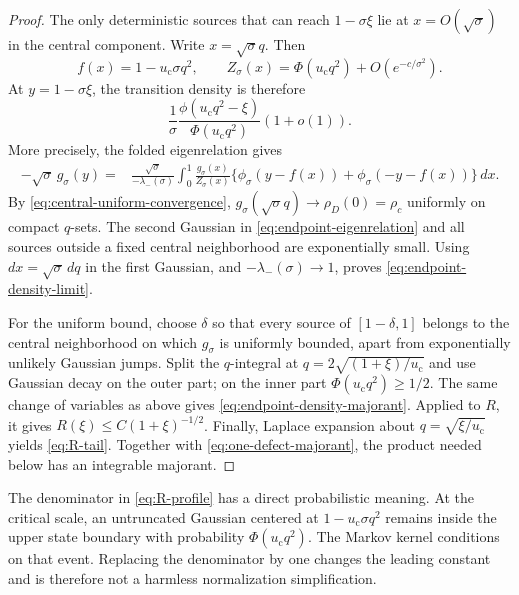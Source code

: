\documentclass[11pt]{article}
\theoremstyle{definition}
\theoremstyle{remark}
\newcommand{\uc}{u_{\mathrm c}}
\begin{document}
\begin{proof}
The only deterministic sources that can reach $1-\sigma\xi$ lie at
$x=O(\sqrt\sigma)$ in the central component.  Write
$x=\sqrt\sigma q$.  Then
\begin{equation}\label{eq:critical-scaling}
 f(x)=1-\uc\sigma q^2,
 \qquad
 Z_\sigma(x)=\Phi(\uc q^2)+O(e^{-c/\sigma^2}).
\end{equation}
At $y=1-\sigma\xi$, the transition density is therefore
\begin{equation}\label{eq:kernel-scaling}
 \frac1\sigma
 \frac{\phi(\uc q^2-\xi)}{\Phi(\uc q^2)}
 (1+o(1)).
\end{equation}
More precisely, the folded eigenrelation gives
\begin{align}
 -\sqrt\sigma\,g_\sigma(y)
  ={}&\frac{\sqrt\sigma}{-\lambda_-(\sigma)}
  \int_0^1\frac{g_\sigma(x)}{Z_\sigma(x)}
  \bigl\{\phi_\sigma(y-f(x))+\phi_\sigma(-y-f(x))\bigr\}\,dx.
 \label{eq:endpoint-eigenrelation}
\end{align}
By \eqref{eq:central-uniform-convergence},
$g_\sigma(\sqrt\sigma q)\to\rho_D(0)=\rho_c$ uniformly on compact
$q$-sets.  The second Gaussian in \eqref{eq:endpoint-eigenrelation} and all
sources outside a fixed central neighborhood are exponentially small.
Using $dx=\sqrt\sigma\,dq$ in the first Gaussian, and
$-\lambda_-(\sigma)\to1$, proves \eqref{eq:endpoint-density-limit}.

For the uniform bound, choose $\delta$ so that every source of
$[1-\delta,1]$ belongs to the central neighborhood on which $g_\sigma$ is
uniformly bounded, apart from exponentially unlikely Gaussian jumps.  Split
the $q$-integral at $q=2\sqrt{(1+\xi)/\uc}$ and use Gaussian decay on the
outer part; on the inner part $\Phi(\uc q^2)\ge1/2$.  The same change of
variables as above gives \eqref{eq:endpoint-density-majorant}.  Applied to
$R$, it gives $R(\xi)\le C(1+\xi)^{-1/2}$.  Finally, Laplace expansion about
$q=\sqrt{\xi/\uc}$ yields \eqref{eq:R-tail}.  Together with
\eqref{eq:one-defect-majorant}, the product needed below has an integrable
majorant.
\end{proof}

The denominator in \eqref{eq:R-profile} has a direct probabilistic meaning.
At the critical scale, an untruncated Gaussian centered at
$1-\uc\sigma q^2$ remains inside the upper state boundary with probability
$\Phi(\uc q^2)$.  The Markov kernel conditions on that event.  Replacing the
denominator by one changes the leading constant and is therefore not a
harmless normalization simplification.
\end{document}
